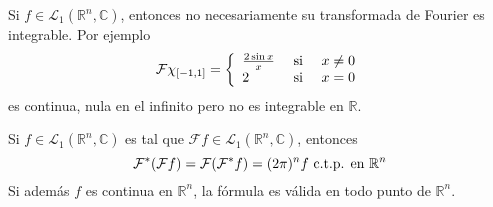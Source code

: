 \documentclass[12pt]{report}
\theoremstyle{largebreak}
\newcommand{\fou}[1]{\ensuremath{\mathcal{F}#1}}
\begin{document}
    \begin{obs}
        Si $f\in\mathcal{L}_1(\mathbb{R}^n,\mathbb{C})$, entonces no necesariamente su transformada de Fourier es integrable. Por ejemplo
        \begin{equation*}
             \fou{\chi_{[-1,1]}}=\left\{
                \begin{array}{lcr}
                    \frac{2\sin x}{x} & \textup{ si } & x\neq0\\
                    2 & \textup{ si } & x=0\\
                \end{array}
             \right.
        \end{equation*}
        es continua, nula en el infinito pero no es integrable en $\mathbb{R}$.
    \end{obs}

    \renewcommand{\theenumi}{\arabic{enumi}}

    \begin{theor}
        Si $f\in\mathcal{L}_1(\mathbb{R}^n,\mathbb{C})$ es tal que $\fou{f}\in\mathcal{L}_1(\mathbb{R}^n,\mathbb{C})$, entonces
        \begin{equation*}
            \fou^*{(\fou{f})}=\fou{(\fou^*{f})}=(2\pi)^n f\textup{ c.t.p. en }\mathbb{R}^n
        \end{equation*}
        Si además $f$ es continua en $\mathbb{R}^n$, la fórmula es válida en todo punto de $\mathbb{R}^n$.
    \end{theor}
\end{document}
